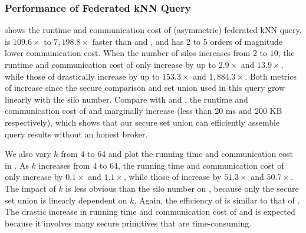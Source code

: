 \begin{table}[t]  
    \caption{Improvement with DP in federated kNN.}  
    \label{tab:dp-opt-percent} 
    \begin{small} 
    \end{small}
\end{table}

\subsubsection{Performance of Federated kNN Query}
\label{sec:exp-asym-knn}

 shows the runtime and communication cost of (asymmetric) federated kNN query.
\sysname is $109.6\times$ to $7,198.8\times$ faster than \smcql and \conclave, and has $2$ to $5$ orders of magnitude lower communication cost.
When the number of silos increases from $2$ to $10$, the runtime and communication cost of \sysname only increase by up to $2.9\times$ and $13.9\times$, while those of \conclave drastically increase by up to $153.3\times$ and $1,884.3\times$.
Both metrics of \sysname increase since the secure comparison and set union used in this query grow linearly with the silo number.
Compare with \conclave and \smcql, the runtime and communication cost of \conclaveext and \smcqlext marginally increase (less than 20 ms and 200 KB respectively), which shows that our secure set union can efficiently assemble query results without an honest broker.

We also vary $k$ from $4$ to $64$ and plot the running time and communication cost in .
As $k$ increases from $4$ to $64$, the running time and communication cost of \sysname only increase by $0.1\times$ and $1.1\times$, while those of \conclave increase by $51.3\times$ and $50.7\times$.
The impact of $k$ is less obvious than the silo number on \sysname, because only the secure set union is linearly dependent on $k$.
Again, the efficiency of \conclaveext is similar to that of \conclave.
The drastic increase in running time and communication cost of \conclave and \conclaveext is expected because it involves many secure primitives that are time-consuming.

